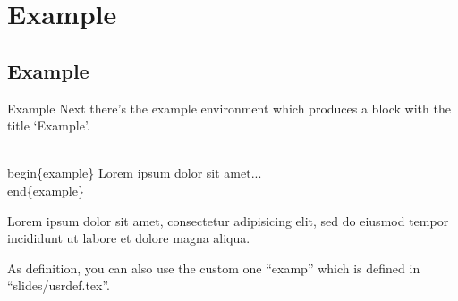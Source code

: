 \section{Example}
\subsection{Example}
\label{example}
\begin{frame}{Example}
  Next there’s the example environment which produces a block with the title ‘Example’.
  \begin{semiverbatim}
    \\begin\{example\}\newline
    Lorem ipsum dolor sit amet...\newline
    \\end\{example\}
  \end{semiverbatim}
  \begin{example}
    Lorem ipsum dolor sit amet, consectetur adipisicing elit, sed do eiusmod tempor incididunt ut labore et dolore magna aliqua.
  \end{example}
  As definition, you can also use the custom one ``examp'' which is defined in ``slides/usrdef.tex''.
\end{frame}
